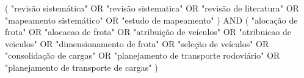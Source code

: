 (
    "revisão sistemática"
        OR "revisão sistematica"
        OR "revisão de literatura"
        OR "mapeamento sistemático"
        OR "estudo de mapeamento"
) AND (
    "alocação de frota"
        OR "alocacao de frota"
        OR "atribuição de veículos"
        OR "atribuicao de veiculos"
        OR "dimensionamento de frota"
        OR "seleção de veículos"
        OR "consolidação de cargas"
        OR "planejamento de transporte rodoviário"
        OR "planejamento de transporte de cargas"
)
